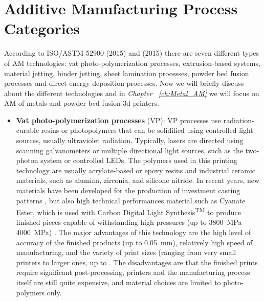\section{Additive Manufacturing Process Categories} 
\label{sec:AMproc}
According to ISO/ASTM 52900 \cite{organization_isoastm_2015} (2015) and \citeauthor{gibson_additive_2015} (2015) there are seven different types of AM technologies: vat photo-polymerization processes, extrusion-based systems, material jetting, binder jetting, sheet lamination processes, powder bed fusion processes and direct energy deposition processes. Now we will briefly discuss about the different technologies and in \emph{Chapter~ \ref{ch:Metal_AM}} we will focus on AM of metals and powder bed fusion 3d printers.
\begin{itemize}
    \item \textbf{Vat photo-polymerization processes} (VP): VP processes use radiation-curable resins or photopolymers that can be solidified using controlled light sources, usually ultraviolet radiation. Typically, lasers are directed using scanning galvanometers or multiple directional light sources, such as the two-photon system or controlled LEDs. The polymers used in this printing technology are usually acrylate-based or epoxy resins and industrial ceramic materials, such as alumina, zirconia, and silicone nitride. In recent years, new materials have been developed for the production of investment casting patterns \cite{3d_systems_investment_2023}, but also high technical performances material such as Cyanate Ester, which is used with Carbon Digital Light Synthesis\textsuperscript{TM} to produce finished pieces capable of withstanding high pressures (up to \SIrange[range-phrase = --]{3800}{4000}{\mega\pascal}) \cite{carbon_3d_carbon_2023}. The major advantages of this technology are the high level of accuracy of the finished products (up to \SI{0.05}{\milli\metre}), relatively high speed of manufacturing, and the variety of print sizes (ranging from very small printers to larger ones, up to . The disadvantages are that the finished prints require significant post-processing, printers and the manufacturing process itself are still quite expensive, and material choices are limited to photo-polymers only.

\end{itemize}
